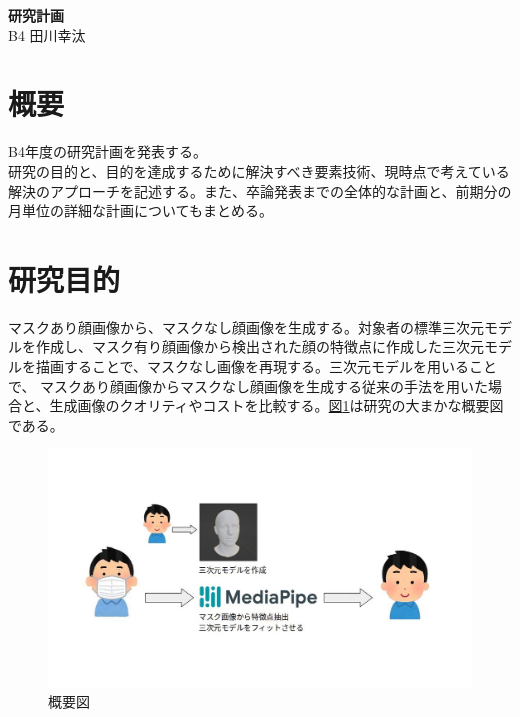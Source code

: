 \documentclass[]{jarticle}          %
\begin{document}

\vspace*{2ex}
\begin{center}
 {\Large \bf 研究計画}\\ %
 \vspace*{5mm}
 {\large B4 田川幸汰}%
\end{center}



\section{概要}
 B4年度の研究計画を発表する。 \\
 研究の目的と、目的を達成するために解決すべき要素技術、現時点で考えている解決のアプローチを記述する。また、卒論発表までの全体的な計画と、前期分の月単位の詳細な計画についてもまとめる。

\section{研究目的}
マスクあり顔画像から、マスクなし顔画像を生成する。対象者の標準三次元モデルを作成し、マスク有り顔画像から検出された顔の特徴点に作成した三次元モデルを描画することで、マスクなし画像を再現する。三次元モデルを用いることで、
マスクあり顔画像からマスクなし顔画像を生成する従来の手法を用いた場合と、生成画像のクオリティやコストを比較する。\hyperref[graphone]{図\ref{graphone}}は研究の大まかな概要図である。
\begin{figure}[!ht]
  \begin{center}
    \includegraphics[scale=0.5]{figures/1.jpg}
    \caption{概要図}
    \label{graphone}
  \end{center}
\end{figure}
\end{document}
